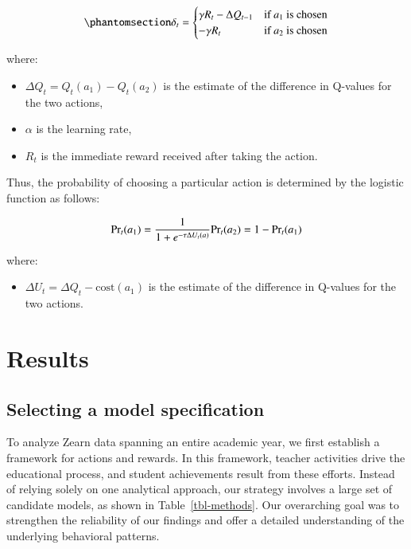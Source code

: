 \documentclass[
  number,
  preprint,
  3p,
  onecolumn]{elsarticle}
\providecommand{\tightlist}{%
  \setlength{\itemsep}{0pt}\setlength{\parskip}{0pt}}\usepackage{longtable,booktabs,array}
\begin{document}
\begin{equation}\phantomsection\label{eq-state-free}{
\delta_t =
\begin{cases}
\gamma R_t - \Delta Q_{t-1} & \text{if } a_1 \text{ is chosen} \\
-\gamma R_t & \text{if } a_2 \text{ is chosen}
\end{cases}
}\end{equation}

where:

\begin{itemize}
\item
  \(\Delta Q_{t}=Q_{t}(a_1)-Q_{t}(a_2)\) is the estimate of the
  difference in Q-values for the two actions,
\item
  \(\alpha\) is the learning rate,
\item
  \(R_t\) is the immediate reward received after taking the action.
\end{itemize}

Thus, the probability of choosing a particular action is determined by
the logistic function as follows:

\[
\text{Pr}_t(a_1) = \frac{1}{1+e^{-\tau \Delta U_{t}(a)}}
\\
\text{Pr}_t(a_2) = 1 - \text{Pr}_t(a_1)
\]

where:

\begin{itemize}
\tightlist
\item
  \(\Delta U_{t}=\Delta Q_{t} - \text{cost}(a_1)\) is the estimate of
  the difference in Q-values for the two actions.
\end{itemize}

\section{Results}\label{results}

\subsection{Selecting a model
specification}\label{selecting-a-model-specification}

To analyze Zearn data spanning an entire academic year, we first
establish a framework for actions and rewards. In this framework,
teacher activities drive the educational process, and student
achievements result from these efforts. Instead of relying solely on one
analytical approach, our strategy involves a large set of candidate
models, as shown in Table~\ref{tbl-methods}. Our overarching goal was to
strengthen the reliability of our findings and offer a detailed
understanding of the underlying behavioral patterns.
\end{document}
